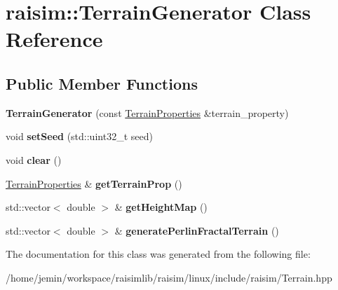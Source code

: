 \hypertarget{classraisim_1_1TerrainGenerator}{}\section{raisim\+:\+:Terrain\+Generator Class Reference}
\label{classraisim_1_1TerrainGenerator}
\subsection*{Public Member Functions}
\begin{DoxyCompactItemize}
\item 
\mbox{\label{classraisim_1_1TerrainGenerator_a37194cccc8eb06951718a73e4896635c}} 
{\bfseries Terrain\+Generator} (const \hyperlink{structraisim_1_1TerrainProperties}{Terrain\+Properties} \&terrain\+\_\+property)
\item 
\mbox{\label{classraisim_1_1TerrainGenerator_a854477f99a6d37958a4933f7c0555703}} 
void {\bfseries set\+Seed} (std\+::uint32\+\_\+t seed)
\item 
\mbox{\label{classraisim_1_1TerrainGenerator_a3b278af1345fc79bdeea52ec8bb63f88}} 
void {\bfseries clear} ()
\item 
\mbox{\label{classraisim_1_1TerrainGenerator_a298583d7f5d491b10717f5604607e5ee}} 
\hyperlink{structraisim_1_1TerrainProperties}{Terrain\+Properties} \& {\bfseries get\+Terrain\+Prop} ()
\item 
\mbox{\label{classraisim_1_1TerrainGenerator_abff6d6984c7b4c710b51ca16023c6f67}} 
std\+::vector$<$ double $>$ \& {\bfseries get\+Height\+Map} ()
\item 
\mbox{\label{classraisim_1_1TerrainGenerator_a9be5adbd64d7f364e3152f74efe39f4f}} 
std\+::vector$<$ double $>$ \& {\bfseries generate\+Perlin\+Fractal\+Terrain} ()
\end{DoxyCompactItemize}


The documentation for this class was generated from the following file\+:\begin{DoxyCompactItemize}
\item 
/home/jemin/workspace/raisimlib/raisim/linux/include/raisim/Terrain.\+hpp\end{DoxyCompactItemize}
